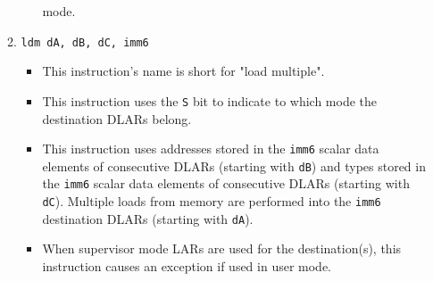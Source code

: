 \documentclass{article}
\begin{document}
\begin{itemize}
\begin{enumerate}
\begin{itemize}
					mode.
				\end{itemize}
			\item \texttt{ldm dA, dB, dC, imm6}
				\begin{itemize}
				\item This instruction's name is short for "load multiple".
				\item This instruction uses the \texttt{S} bit to indicate
					to which mode the destination DLARs belong.
				\item This instruction uses addresses stored in the
					\texttt{imm6} scalar data elements of consecutive DLARs
					(starting with \texttt{dB}) and types stored in the
					\texttt{imm6} scalar data elements of consecutive DLARs
					(starting with \texttt{dC}). Multiple loads from memory
					are performed into the \texttt{imm6} destination DLARs
					(starting with \texttt{dA}).
				\item When supervisor mode LARs are used for the
					destination(s), this instruction causes an exception if
					used in user mode.
				\end{itemize}


\end{enumerate}
\end{itemize}
\end{document}
